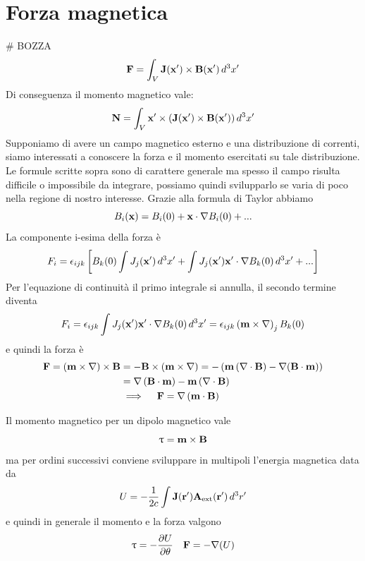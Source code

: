 \section{Forza magnetica}
\# BOZZA
\begin{equation} \label{eq:forza_magnetica}
  \mathbf{ F } = \int_V \mathbf{ J(x') } \times \mathbf{ B(x') } \,d^3x'
\end{equation}
Di conseguenza il momento magnetico vale:
\begin{equation} \label{eq:momento_forza_magnetica}
  \mathbf{ N } = \int_V \mathbf{ x' \times \left( J(x') \times B(x') \right) } \,d^3x'
\end{equation}
Supponiamo di avere un campo magnetico esterno e una distribuzione di correnti, siamo interessati a conoscere la forza e il momento 
esercitati su tale distribuzione. Le formule scritte sopra sono di carattere generale ma spesso il campo 
risulta difficile o impossibile da integrare, possiamo quindi svilupparlo se varia di poco nella regione di nostro interesse.
Grazie alla formula di Taylor abbiamo
\begin{equation}
  B_i(\mathbf{ x }) = B_i(0) + \mathbf{ x } \cdot \nabla B_i(0) + ...
\end{equation}
La componente i-esima della forza è 
\begin{equation}
  F_i = \epsilon_{ijk} \left[ B_k(0)\int J_j(\mathbf{ x' }) \,d^3x' + \int J_j(\mathbf{ x' }) \mathbf{ x' } \cdot \nabla B_k(0) \,d^3x' + ... \right]
\end{equation}
Per l'equazione di continuità il primo integrale si annulla, il secondo termine diventa
\begin{align}
  F_i = \epsilon_{ijk} \int J_j(\mathbf{ x' }) \mathbf{ x' } \cdot \nabla B_k(0) \,d^3x' = \epsilon_{ijk} \left( \mathbf{ m } \times \nabla \right)_j B_k(0)
\end{align}
e quindi la forza è
\begin{align}
  \mathbf{ F } = \left( \mathbf{ m } \times \nabla \right) \times \mathbf{ B } &= - \mathbf{ B \times \left( m \times \nabla \right) } 
  = - \left( \mathbf{ m \left( \nabla \cdot B \right) } - \nabla \mathbf{ \left( B \cdot m \right) }\right) \\
  &= \nabla \left( \mathbf{ B \cdot m } \right) - \mathbf{ m \left( \nabla \cdot B \right)} \\
  & \implies \quad \mathbf{ F } = \nabla \left( \mathbf{ m \cdot B } \right)
\end{align}

Il momento magnetico per un dipolo magnetico vale
\begin{equation}
  \mathbf{ \uptau } = \mathbf{ m } \times \mathbf{ B }
\end{equation}
ma per ordini successivi conviene sviluppare in multipoli l'energia 
magnetica data da
\begin{equation}
  U = -\frac{1}{2c} \int \mathbf{ J }(\mathbf{ r' }) \mathbf{ A_{\text{ext}}(r') } \,d^3r'
\end{equation}
e quindi in generale il momento e la forza valgono
\begin{align}
  \mathbf{ \uptau } = - \frac{\partial U }{\partial \theta } && \mathbf{ F } = - \nabla (U)
\end{align}

